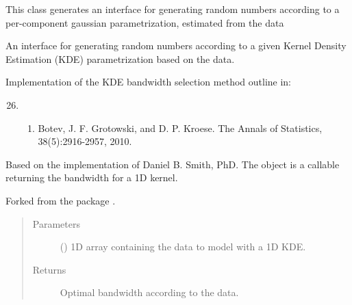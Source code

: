 \documentclass[letterpaper,10pt,english]{sphinxmanual}
\begin{document}

\begin{fulllineitems}
\label{\detokenize{api:brainSimulator.GaussianEstimator}}
This class generates an interface for generating random numbers according
to a per-component gaussian parametrization, estimated from the data

\end{fulllineitems}


\begin{fulllineitems}
\label{\detokenize{api:brainSimulator.KDEestimator}}
An interface for generating random numbers according
to a given Kernel Density Estimation (KDE) parametrization based on the 
data.

\begin{fulllineitems}
\label{\detokenize{api:brainSimulator.KDEestimator.botev_bandwidth}}
Implementation of the KDE bandwidth selection method outline in:
\begin{enumerate}
\setcounter{enumi}{25}
\item {} \begin{enumerate}
\item {} 
Botev, J. F. Grotowski, and D. P. Kroese.  The Annals of Statistics, 38(5):2916-2957, 2010.

\end{enumerate}

\end{enumerate}

Based on the implementation of Daniel B. Smith, PhD. The object is a callable returning the bandwidth for a 1D kernel.

Forked from the package .
\begin{quote}\begin{description}
\item[{Parameters}] \leavevmode
{} () \textendash{} 1D array containing the data to model with a 1D KDE.

\item[{Returns}] \leavevmode
Optimal bandwidth according to the data.

\end{description}\end{quote}

\end{fulllineitems}


\end{fulllineitems}
\end{document}
